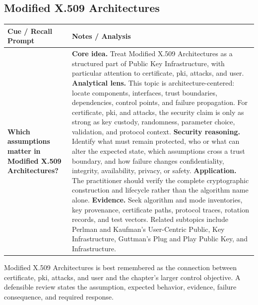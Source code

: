 \documentclass[11pt]{article}
\newcommand{\CornellHeader}{%
\rowcolor{Navy}\color{white}\bfseries Cue / Recall Prompt & \color{white}\bfseries Notes / Analysis\\\hline}
\newcommand{\CornellRow}[2]{%
\cellcolor{CueGray}\RaggedRight\textbf{#1} & \RaggedRight #2\\\hline}
\begin{document}
\subsection*{Modified X.509 Architectures}
\begin{longtable}{>{\RaggedRight\arraybackslash}p{}|>{\RaggedRight\arraybackslash}p{}}
\CornellHeader
\CornellRow{Which assumptions matter in Modified X.509 Architectures?}{\textbf{Core idea.} Treat Modified X.509 Architectures as a structured part of Public Key Infrastructure, with particular attention to certificate, pki, attacks, and user. \textbf{Analytical lens.} This topic is architecture-centered: locate components, interfaces, trust boundaries, dependencies, control points, and failure propagation. For certificate, pki, and attacks, the security claim is only as strong as key custody, randomness, parameter choice, validation, and protocol context. \textbf{Security reasoning.} Identify what must remain protected, who or what can alter the expected state, which assumptions cross a trust boundary, and how failure changes confidentiality, integrity, availability, privacy, or safety. \textbf{Application.} The practitioner should verify the complete cryptographic construction and lifecycle rather than the algorithm name alone. \textbf{Evidence.} Seek algorithm and mode inventories, key provenance, certificate paths, protocol traces, rotation records, and test vectors. Related subtopics include Perlman and Kaufman's User-Centric Public, Key Infrastructure, Guttman's Plug and Play Public Key, and Infrastructure.}
\end{longtable}
\begin{topicsummary}
Modified X.509 Architectures is best remembered as the connection between certificate, pki, attacks, and user and the chapter's larger control objective. A defensible review states the assumption, expected behavior, evidence, failure consequence, and required response.
\end{topicsummary}
\end{document}
